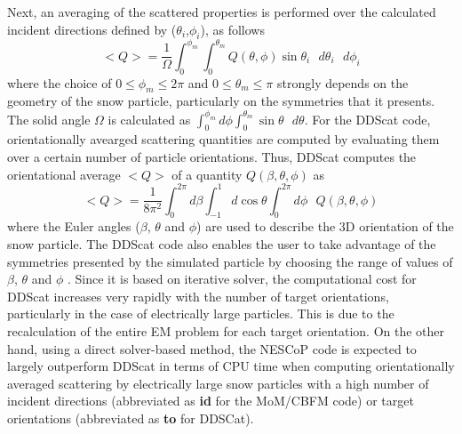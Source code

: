 \documentclass{article}
\begin{document}
Next, an averaging of the scattered properties is performed over the calculated incident directions defined by ($\theta_i$,$\phi_i$), as follows  
\begin{equation}
<Q> = \frac{1}{\Omega} \int_0^{\phi_{m}} \int_{0}^{\theta_{m}} Q(\theta, \phi) \sin\theta_i \text{ } d\theta_i \text{ } d\phi_i
\label{equ_AvScat}
\end{equation} 
where the choice of $0 \leq \phi_m \leq 2\pi$ and $0 \leq \theta_m \leq \pi$ strongly depends on the geometry of the snow particle, particularly on the symmetries that it presents. The solid angle $\Omega$ is calculated as $\int_0^{\phi_{m}} d\phi \int_{0}^{\theta_{m}} \sin\theta \text{ } d\theta$.
For the DDScat code, orientationally avearged scattering quantities are computed by evaluating them over a certain number of particle orientations. Thus, DDScat computes the orientational average $<Q>$ of a quantity $Q(\beta, \theta, \phi)$ \cite{draine2013user} as
\begin{equation}
<Q> = \frac{1}{8\pi^2} \int_0^{2\pi} d\beta \int_{-1}^1 d\cos\theta \int_0^{2\pi} d\phi \text{ } Q(\beta, \theta, \phi)
\label{equ1}
\end{equation} 
where the Euler angles ($\beta$, $\theta$ and $\phi$) are used to describe the 3D orientation of the snow particle. The DDScat code also enables the user to take advantage of the symmetries presented by the simulated particle by choosing the range of values of $\beta$, $\theta$ and $\phi$ \cite{draine2013user}. 
Since it is based on iterative solver, the computational cost for DDScat increases very rapidly with the number of target orientations, particularly in the case of electrically large particles. This is due to the recalculation of the entire EM problem for each target orientation. On the other hand, using a direct solver-based method, the NESCoP code is expected to largely outperform DDScat in terms of CPU time when computing orientationally averaged scattering by electrically large snow particles with a high number of incident directions (abbreviated as \textbf{id} for the MoM/CBFM code) or target orientations (abbreviated as \textbf{to} for DDSCat). 
\end{document}
